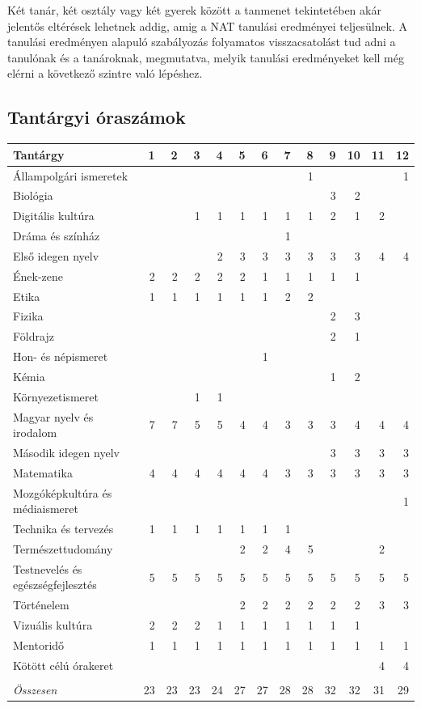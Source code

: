 Két tanár, két osztály vagy két gyerek között a tanmenet tekintetében
akár jelentős eltérések lehetnek addig, amig a NAT tanulási eredményei
teljesülnek. A tanulási eredményen alapuló szabályozás folyamatos
visszacsatolást tud adni a tanulónak és a tanároknak, megmutatva, melyik
tanulási eredményeket kell még elérni a következő szintre való lépéshez.

\hypertarget{tantargyi-oraszamok}{%
\subsection{Tantárgyi óraszámok}\label{tantargyi-oraszamok}}

\begin{longtable}[]{@{}lrrrrrrrrrrrr@{}}
\toprule
Tantárgy & 1 & 2 & 3 & 4 & 5 & 6 & 7 & 8 & 9 & 10 & 11 &
12\tabularnewline
\midrule
\endhead
Állampolgári ismeretek & & & & & & & & 1 & & & & 1\tabularnewline
Biológia & & & & & & & & & 3 & 2 & &\tabularnewline
Digitális kultúra & & & 1 & 1 & 1 & 1 & 1 & 1 & 2 & 1 & 2
&\tabularnewline
Dráma és színház & & & & & & & 1 & & & & &\tabularnewline
Első idegen nyelv & & & & 2 & 3 & 3 & 3 & 3 & 3 & 3 & 4 &
4\tabularnewline
Ének-zene & 2 & 2 & 2 & 2 & 2 & 1 & 1 & 1 & 1 & 1 & &\tabularnewline
Etika & 1 & 1 & 1 & 1 & 1 & 1 & 2 & 2 & & & &\tabularnewline
Fizika & & & & & & & & & 2 & 3 & &\tabularnewline
Földrajz & & & & & & & & & 2 & 1 & &\tabularnewline
Hon- és népismeret & & & & & & 1 & & & & & &\tabularnewline
Kémia & & & & & & & & & 1 & 2 & &\tabularnewline
Környezetismeret & & & 1 & 1 & & & & & & & &\tabularnewline
Magyar nyelv és irodalom & 7 & 7 & 5 & 5 & 4 & 4 & 3 & 3 & 3 & 4 & 4 &
4\tabularnewline
Második idegen nyelv & & & & & & & & & 3 & 3 & 3 & 3\tabularnewline
Matematika & 4 & 4 & 4 & 4 & 4 & 4 & 3 & 3 & 3 & 3 & 3 &
3\tabularnewline
Mozgóképkultúra és médiaismeret & & & & & & & & & & & & 1\tabularnewline
Technika és tervezés & 1 & 1 & 1 & 1 & 1 & 1 & 1 & & & &
&\tabularnewline
Természettudomány & & & & & 2 & 2 & 4 & 5 & & & 2 &\tabularnewline
Testnevelés és egészségfejlesztés & 5 & 5 & 5 & 5 & 5 & 5 & 5 & 5 & 5 &
5 & 5 & 5\tabularnewline
Történelem & & & & & 2 & 2 & 2 & 2 & 2 & 2 & 3 & 3\tabularnewline
Vizuális kultúra & 2 & 2 & 2 & 1 & 1 & 1 & 1 & 1 & 1 & 1 &
&\tabularnewline
Mentoridő & 1 & 1 & 1 & 1 & 1 & 1 & 1 & 1 & 1 & 1 & 1 & 1\tabularnewline
Kötött célú órakeret & & & & & & & & & & & 4 & 4\tabularnewline
& & & & & & & & & & & &\tabularnewline
\emph{Összesen} & 23 & 23 & 23 & 24 & 27 & 27 & 28 & 28 & 32 & 32 & 31 &
29\tabularnewline
\bottomrule
\end{longtable}

